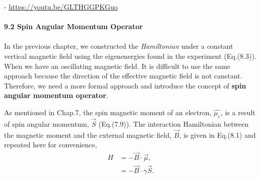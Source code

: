 \documentclass{article}
\begin{document}
- \url{https://youtu.be/GLTHGGPKGuo}
\\\\
\textbf{\large 9.2 Spin Angular Momentum Operator}\\\\
In the previous chapter, we constructed the \textit{Hamiltonian} under a constant vertical
magnetic field using the eigenenergies found in the experiment (Eq.(8.3)). When we have an
oscillating magnetic field. It is difficult to use the same approach because the direction of the 
effective magnetic field is not canstant. Therefore, we need a more formal approach and 
introduce the concept of \textbf{spin angular momentum operator}.

As mentioned in Chap.7, the spin magnetic moment of an electron, $\hat{\mu_e}$, is a result
of spin angular momentum, $\vec{S}$ (Eq.(7.9)). The interaction Hamiltonian between
the magnetic moment and the external magnetic field, $\vec{B}$, is given in Eq.(8.1) and 
repeated here for convenience,
\begin{align*}\label{eq 9.1}
    H&=-\vec{B}\cdot\vec{\mu},\\
    &=-\vec{B}\cdot\gamma\vec{S}.\tag{9.1}
\end{align*} 
\end{document}

